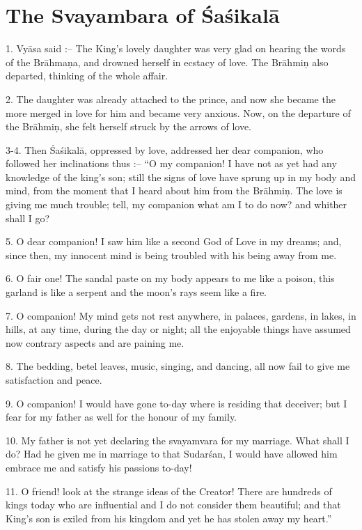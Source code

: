 \chapter{The Svayambara of \'Sa\'sikal\=a}

1. Vy\=asa said :-- The King's lovely daughter was very glad on hearing the words of the Br\=ahma\d{n}a, and drowned herself in ecstacy of love. The Br\=ahmi\d{n} also departed, thinking of the whole affair.

2. The daughter was already attached to the prince, and now she became the more merged in love for him and became very anxious. Now, on the departure of the Br\=ahmi\d{n}, she felt herself struck by the arrows of love.

3-4. Then \'Sa\'sikal\=a, oppressed by love, addressed her dear companion, who followed her inclinations thus :-- ``O my companion! I have not as yet had any knowledge of the king's son; still the signs of love have sprung up in my body and mind, from the moment that I heard about him from the Br\=ahmi\d{n}. The love is giving me much trouble; tell, my companion what am I to do now? and whither shall I go?

5. O dear companion! I saw him like a second God of Love in my dreams; and, since then, my innocent mind is being troubled with his being away from me.

6. O fair one! The sandal paste on my body appears to me like a poison, this garland is like a serpent and the moon's rays seem like a fire.

7. O companion! My mind gets not rest anywhere, in palaces, gardens, in lakes, in hills, at any time, during the day or night; all the enjoyable things have assumed now contrary aspects and are paining me.

8. The bedding, betel leaves, music, singing, and dancing, all now fail to give me satisfaction and peace.

9. O companion! I would have gone to-day where is residing that deceiver; but I fear for my father as well for the honour of my family.

10. My father is not yet declaring the svayamvara for my marriage. What shall I do? Had he given me in marriage to that Sudar\'san, I would have allowed him embrace me and satisfy his passions to-day!

11. O friend! look at the strange ideas of the Creator! There are hundreds of kings today who are influential and I do not consider them beautiful; and that King's son is exiled from his kingdom and yet he has stolen away my heart.''


